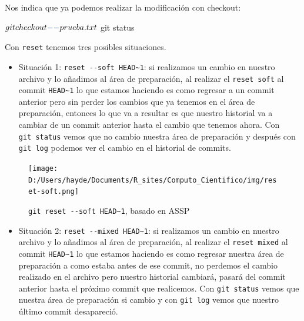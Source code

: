 \documentclass[
]{book}
\newenvironment{Shaded}{\begin{snugshade}}{\end{snugshade}}
\newcommand{\AttributeTok}[1]{\textcolor[rgb]{0.13,0.29,0.53}{#1}}
\newcommand{\ExtensionTok}[1]{#1}
\newcommand{\NormalTok}[1]{#1}
\providecommand{\tightlist}{%
  \setlength{\itemsep}{0pt}\setlength{\parskip}{0pt}}
\begin{document}
Nos indica que ya podemos realizar la modificación con checkout:

\begin{Shaded}
\begin{Highlighting}[]
\ExtensionTok{$}\NormalTok{ git checkout }\AttributeTok{{-}{-}}\NormalTok{ prueba.txt}
\ExtensionTok{$}\NormalTok{ git status}
\end{Highlighting}
\end{Shaded}

Con \texttt{reset} tenemos tres posibles situaciones.

\begin{itemize}
\tightlist
\item
  Situación 1: \texttt{reset\ -\/-soft\ HEAD\textasciitilde{}1}: si realizamos un cambio en nuestro archivo y lo añadimos al área de preparación, al realizar el \texttt{reset\ soft} al commit \texttt{HEAD\textasciitilde{}1} lo que estamos haciendo es como regresar a un commit anterior pero sin perder los cambios que ya tenemos en el área de preparación, entonces lo que va a resultar es que nuestro historial va a cambiar de un commit anterior hasta el cambio que tenemos ahora. Con \texttt{git\ status} vemos que no cambio nuestra área de preparación y después con \texttt{git\ log} podemos ver el cambio en el historial de commits.
\end{itemize}

\begin{figure}
\centering
\texttt{[image: D:/Users/hayde/Documents/R\_sites/Computo\_Cientifico/img/reset-soft.png]}
\caption{\texttt{git\ reset\ -\/-soft\ HEAD\textasciitilde{}1}, basado en ASSP}
\end{figure}

\begin{itemize}
\tightlist
\item
  Situación 2: \texttt{reset\ -\/-mixed\ HEAD\textasciitilde{}1}: si realizamos un cambio en nuestro archivo y lo añadimos al área de preparación, al realizar el \texttt{reset\ mixed} al commit \texttt{HEAD\textasciitilde{}1} lo que estamos haciendo es como regresar nuestra área de preparación a como estaba antes de ese commit, no perdemos el cambio realizado en el archivo pero nuestro historial cambiará, pasará del commit anterior hasta el próximo commit que realicemos. Con \texttt{git\ status} vemos que nuestra área de preparación si cambio y con \texttt{git\ log} vemos que nuestro último commit desapareció.
\end{itemize}
\end{document}
